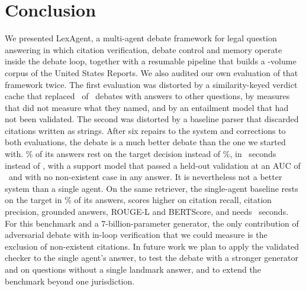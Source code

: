 \documentclass[conference]{IEEEtran}
\newcommand{\sys}{LexAgent}
\begin{document}
\section{Conclusion}
We presented \sys, a multi-agent debate framework for legal question answering in which citation verification, debate control and memory operate inside the debate loop, together with a resumable pipeline that builds a \ResCorpusVolumes-volume corpus of the United States Reports. We also audited our own evaluation of that framework twice. The first evaluation was distorted by a similarity-keyed verdict cache that replaced \ResAudCacheBench\ of \ResTestCases\ debates with answers to other questions, by measures that did not measure what they named, and by an entailment model that had not been validated. The second was distorted by a baseline parser that discarded citations written as strings. After six repairs to the system and corrections to both evaluations, the debate is a much better debate than the one we started with. \ResPaFinalTargetAnswer\% of its answers rest on the target decision instead of \ResPaOldTargetAnswer\%, in \ResPaFinalSecondsPerCase\ seconds instead of \ResPaOldSecondsPerCase, with a support model that passed a held-out validation at an AUC of \ResGateTestAUC\ and with no non-existent case in any answer. It is nevertheless not a better system than a single agent. On the same retriever, the single-agent baseline rests on the target in \ResPaBaseFourRTargetAnswer\% of its answers, scores higher on citation recall, citation precision, grounded answers, ROUGE-L and BERTScore, and needs \ResPaBaseFourRSecondsPerCase\ seconds. For this benchmark and a 7-billion-parameter generator, the only contribution of adversarial debate with in-loop verification that we could measure is the exclusion of non-existent citations. In future work we plan to apply the validated checker to the single agent's answer, to test the debate with a stronger generator and on questions without a single landmark answer, and to extend the benchmark beyond one jurisdiction.
\end{document}
